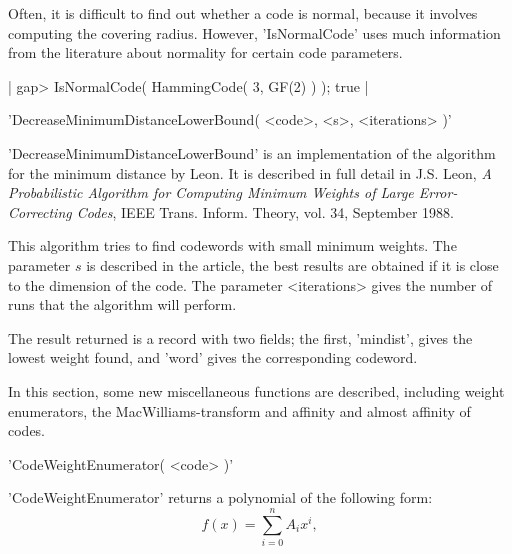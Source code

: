 Often, it is difficult to find out whether a code is normal,
because it involves computing the covering radius.
However, 'IsNormalCode' uses much information from the literature
about normality for certain code parameters.

|    gap> IsNormalCode( HammingCode( 3, GF(2) ) );
    true |




'DecreaseMinimumDistanceLowerBound( <code>, <s>, <iterations> )'

'DecreaseMinimumDistanceLowerBound' is an implementation of
the algorithm for the minimum distance by Leon.
It is described in full detail in J.S. Leon, {\em A Probabilistic
Algorithm for Computing Minimum Weights of Large Error-Correcting
Codes}, IEEE Trans. Inform. Theory, vol. 34, September 1988.

This algorithm tries to find codewords with small minimum weights.
The parameter $s$ is described in the article, the best results are
obtained if it is close to the dimension of the code.
The parameter <iterations> gives the number of runs that the
algorithm will perform.

The result returned is a record with two fields; the first, 'mindist',
gives the lowest weight found, and 'word' gives the corresponding
codeword.





In this section, some new miscellaneous functions are described,
including weight enumerators,
the MacWilliams-transform and affinity and almost affinity of codes.




'CodeWeightEnumerator( <code> )'

'CodeWeightEnumerator' returns a polynomial of the following form:
\begin{equation}
   f(x) = \sum_{i=0}^{n} A_i x^i,
\end{equation}

